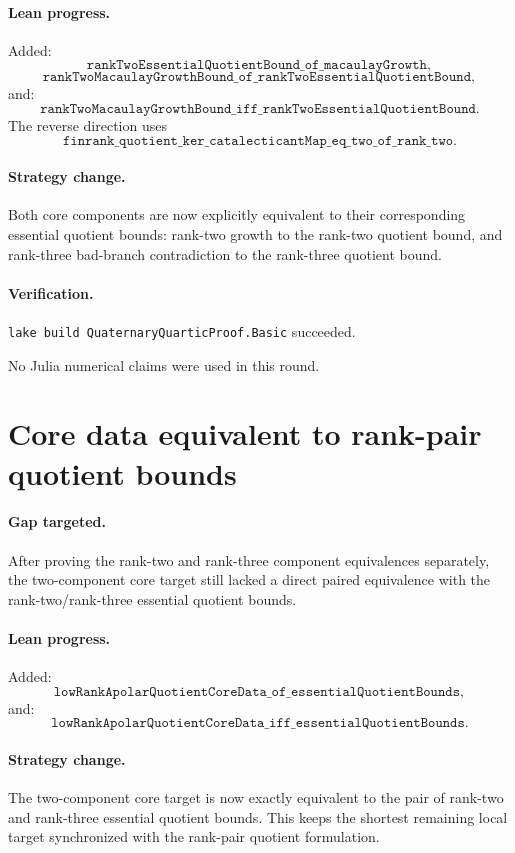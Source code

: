 \documentclass[11pt]{article}
\begin{document}
\paragraph{Lean progress.}
Added:
\[
\texttt{rankTwoEssentialQuotientBound\_of\_macaulayGrowth},
\]
\[
\texttt{rankTwoMacaulayGrowthBound\_of\_rankTwoEssentialQuotientBound},
\]
and:
\[
\texttt{rankTwoMacaulayGrowthBound\_iff\_rankTwoEssentialQuotientBound}.
\]
The reverse direction uses
\[
\texttt{finrank\_quotient\_ker\_catalecticantMap\_eq\_two\_of\_rank\_two}.
\]

\paragraph{Strategy change.}
Both core components are now explicitly equivalent to their corresponding
essential quotient bounds: rank-two growth to the rank-two quotient bound, and
rank-three bad-branch contradiction to the rank-three quotient bound.

\paragraph{Verification.}
\texttt{lake build QuaternaryQuarticProof.Basic} succeeded.

No Julia numerical claims were used in this round.

\section*{Core data equivalent to rank-pair quotient bounds}

\paragraph{Gap targeted.}
After proving the rank-two and rank-three component equivalences separately,
the two-component core target still lacked a direct paired equivalence with
the rank-two/rank-three essential quotient bounds.

\paragraph{Lean progress.}
Added:
\[
\texttt{lowRankApolarQuotientCoreData\_of\_essentialQuotientBounds},
\]
and:
\[
\texttt{lowRankApolarQuotientCoreData\_iff\_essentialQuotientBounds}.
\]

\paragraph{Strategy change.}
The two-component core target is now exactly equivalent to the pair of
rank-two and rank-three essential quotient bounds.  This keeps the shortest
remaining local target synchronized with the rank-pair quotient formulation.
\end{document}
